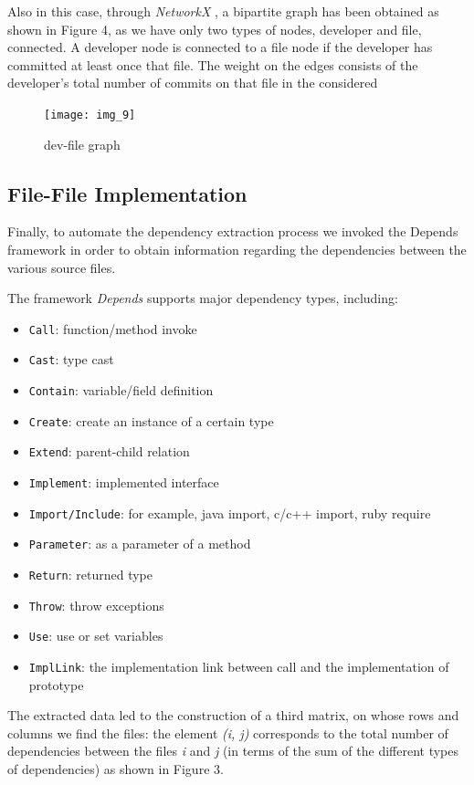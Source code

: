 \documentclass[sigconf]{acmart}
\begin{document}
Also in this case, through {\itshape NetworkX} , a bipartite graph has been obtained as shown in Figure 4, as we have only two types of nodes, developer and file, connected. A developer node is connected to a file node if the developer has committed at least once that file. The weight on the edges consists of the developer’s total number of commits on that file in the considered

\begin{figure}[h]
  \centering
  \texttt{[image: img\_9]}
  \caption{dev-file graph}
  \Description{}
\end{figure}

\subsection{File-File Implementation}
Finally, to automate the dependency extraction process we invoked the Depends framework in order to obtain information regarding the dependencies between the various source files.

The framework {\itshape Depends} supports major dependency types, including:
\begin{itemize}
\item {\verb|Call|}: function/method invoke
\item {\verb|Cast|}: type cast
\item {\verb|Contain|}: variable/field definition
\item {\verb|Create|}: create an instance of a certain type
\item {\verb|Extend|}: parent-child relation
\item {\verb|Implement|}: implemented interface
\item {\verb|Import/Include|}: for example, java import, c/c++ import, ruby require
\item {\verb|Parameter|}: as a parameter of a method
\item {\verb|Return|}: returned type
\item {\verb|Throw|}: throw exceptions
\item {\verb|Use|}: use or set variables
\item {\verb|ImplLink|}: the implementation link between call and the implementation of prototype
\end{itemize}



The extracted data led to the construction of a third matrix, on whose rows and columns we find the files: the element {\itshape (i, j)} corresponds to the total number of dependencies between the files {\itshape i} and {\itshape j} (in terms of the sum of the different types of dependencies) as shown in Figure 3.
\end{document}
